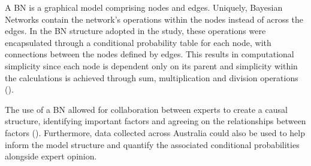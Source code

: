 \documentclass[10pt,letterpaper]{article}
\begin{document}
A BN is a graphical model comprising nodes and edges. Uniquely, Bayesian Networks contain the network's operations within the nodes instead of across the edges. In the BN structure adopted in the study, these operations were encapsulated through a conditional probability table for each node, with connections between the nodes defined by edges. This results in computational simplicity since each node is dependent only on its parent and simplicity within the calculations is achieved through sum, multiplication and division operations
(\cite{korbBayesianArtificialIntelligence2011}).

The use of a BN allowed for collaboration between experts to create a causal structure, identifying important factors and agreeing on the relationships between factors
(\cite{pourretBayesianNetworksPractical2008}). Furthermore, data collected across Australia could also be used to help inform the model structure and quantify the associated conditional probabilities alongside expert opinion.


\end{document}
